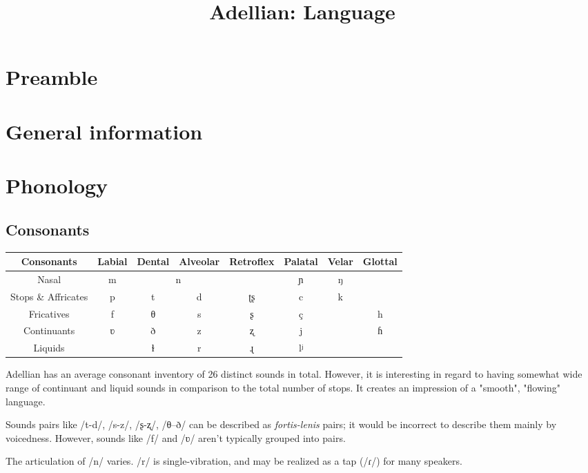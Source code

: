 \documentclass[12pt]{article}
\begin{document}
	\title{Adellian: Language}
	\maketitle

	\section{Preamble}

	\tableofcontents

	\section{General information}

	\section{Phonology}

	\subsection{Consonants}

	\begin{tabular}{||c | c c c c c c c||}
		\hline
		Consonants & Labial & Dental & Alveolar &
		Retroflex & Palatal & Velar & Glottal \\
		\hline
		Nasal & m & \multicolumn{2}{c}{n} & & ɲ & ŋ & \\
		Stops \& Affricates & p & t & d & ʈʂ & c & k & \\
		Fricatives & f & θ & s & ʂ & ç & & h \\
		Continuants & ʋ & ð & z & ʐ & j & & ɦ \\
		Liquids & & ɫ & r & ɻ & lʲ & & \\
		\hline
	\end{tabular}

	Adellian has an average consonant inventory of 26 distinct sounds in total. However, it is interesting in regard to having somewhat wide range of continuant and liquid sounds in comparison to the total number of stops. It creates an impression of a "smooth", "flowing" language.

	Sounds pairs like /t-d/, /s-z/, /ʂ-ʐ/, /θ–ð/ can be described as \emph{fortis-lenis} pairs; it would be incorrect to describe them mainly by voicedness. However, sounds like /f/ and /ʋ/ aren't typically grouped into pairs.

	The articulation of /n/ varies.	/r/ is single-vibration, and may be realized as a tap (/ɾ/) for many speakers.
\end{document}

